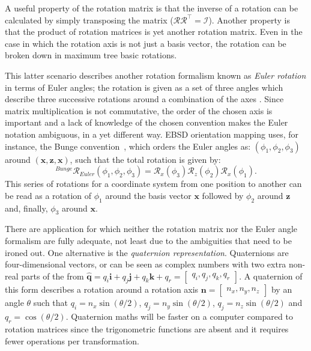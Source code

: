 A useful property of the rotation matrix is that the inverse of a rotation can be calculated by simply transposing the matrix ($\mathcal{R} \mathcal{R}^\intercal  = \mathcal{I}$). Another property is that the product of rotation matrices is yet another rotation matrix. Even in the case in which the rotation axis is not just a basis vector, the rotation can be broken down in maximum tree basic rotations. 

This latter scenario describes another rotation formalism known as \textit{Euler rotation} in terms of Euler angles; the rotation is given as a set of three angles which describe three successive rotations around a combination of the axes . Since matrix multiplication is not commutative, the order of the chosen axis is important and a lack of knowledge of the chosen convention makes the Euler notation ambiguous, in a yet different way. EBSD orientation mapping uses, for instance, the Bunge convention~\cite{Bunge}, which orders the Euler angles as: $(\phi_1, \phi_2, \phi_3)$ around $(\mathbf{x}, \mathbf{z}, \mathbf{x})$, such that the total rotation is given by:
\begin{equation*}
^{Bunge}\mathcal{R}_{Euler}(\phi_1, \phi_2, \phi_3) = \mathcal{R}_x(\phi_3) \mathcal{R}_z(\phi_2) \mathcal{R}_x(\phi_1).
\end{equation*}
This series of rotations for a coordinate system from one position to another can be read as a rotation of $\phi_1$ around the basis vector $\mathbf{x}$ followed by  $\phi_2$ around  $\mathbf{z}$ and, finally, $\phi_3$ around $\mathbf{x}$. 

There are application for which neither the rotation matrix nor the Euler angle formalism are fully adequate, not least due to the ambiguities that need to be ironed out. One alternative is the \textit{quaternion representation}. Quaternions are four-dimensional vectors, or can be seen as complex numbers with two extra non-real parts of the from $\hat{\mathbf{q}}=q_i \mathbf{i} + q_j \mathbf{j} +q_k \mathbf{k} +q_r= \begin{bmatrix}q_i, q_j, q_k, q_r \end{bmatrix}$. A quaternion of this form describes a rotation around a rotation axis $\mathbf{n} = \begin{bmatrix} n_x, n_y, n_z\end{bmatrix}$ by an angle $\theta$ such that $q_i=n_x \sin{(\theta/2)}$, $q_j=n_y \sin{(\theta/2)}$, $q_j=n_z \sin{(\theta/2)}$ and $q_r= \cos{(\theta/2)}$. Quaternion maths will be faster on a computer compared to rotation matrices since the trigonometric functions are absent and it requires fewer operations per transformation. 

